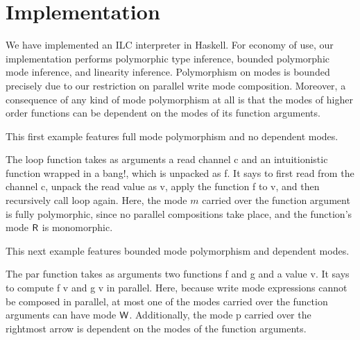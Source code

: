 \section{Implementation}
\label{sec:implementation}

We have implemented an ILC interpreter in Haskell. For economy of use, our
implementation performs polymorphic type inference, bounded polymorphic mode
inference, and linearity inference. Polymorphism on modes is bounded precisely
due to our restriction on parallel write mode composition. Moreover, a
consequence of any kind of mode polymorphism at all is that the modes of higher
order functions can be dependent on the modes of its function arguments.

This first example features full mode polymorphism and no dependent modes.

The \textsf{loop} function takes as arguments a read channel \textsf{c} and an
intuitionistic function wrapped in a bang!, which is unpacked as \textsf{f}.  It
says to first read from the channel \textsf{c}, unpack the read value as
\textsf{v}, apply the function \textsf{f} to \textsf{v}, and then recursively
call \textsf{loop} again. Here, the mode $m$ carried over the function argument
is fully polymorphic, since no parallel compositions take place, and the
function's mode $\textsf{R}$ is monomorphic.

This next example features bounded mode polymorphism and dependent modes.

The \textsf{par} function takes as arguments two functions \textsf{f} and
\textsf{g} and a value \textsf{v}. It says to compute \textsf{f v} and \textsf{g
  v} in parallel. Here, because write mode expressions cannot be composed in
parallel, at most one of the modes carried over the function arguments can have
mode $\textsf{W}$. Additionally, the mode \textsf{p} carried over the rightmost arrow
is dependent on the modes of the function arguments.

